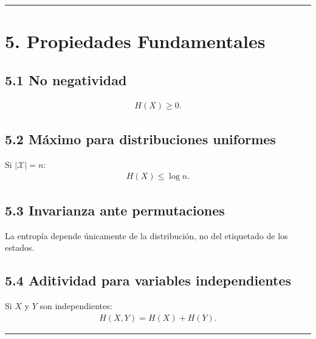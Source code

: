 \documentclass[letterpaper,10pt,english]{jupyterBook}
\begin{document}
\bigskip\hrule\bigskip



\section{5. Propiedades Fundamentales}
\label{\detokenize{01_theory/entropy:propiedades-fundamentales}}

\subsection{5.1 No negatividad}
\label{\detokenize{01_theory/entropy:no-negatividad}}\begin{equation*}
\begin{split}
H(X) \ge 0.
\end{split}
\end{equation*}

\subsection{5.2 Máximo para distribuciones uniformes}
\label{\detokenize{01_theory/entropy:maximo-para-distribuciones-uniformes}}
\sphinxAtStartPar
Si \(|\mathcal{X}| = n\):
\begin{equation*}
\begin{split}
H(X) \le \log n.
\end{split}
\end{equation*}

\subsection{5.3 Invarianza ante permutaciones}
\label{\detokenize{01_theory/entropy:invarianza-ante-permutaciones}}
\sphinxAtStartPar
La entropía depende únicamente de la distribución, no del etiquetado de los estados.


\subsection{5.4 Aditividad para variables independientes}
\label{\detokenize{01_theory/entropy:aditividad-para-variables-independientes}}
\sphinxAtStartPar
Si \(X\) y \(Y\) son independientes:
\begin{equation*}
\begin{split}
H(X,Y) = H(X) + H(Y).
\end{split}
\end{equation*}

\bigskip\hrule\bigskip
\end{document}
